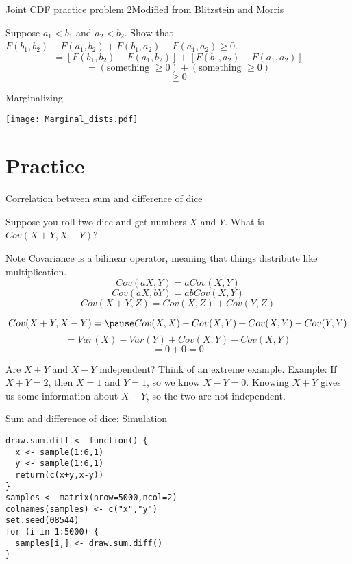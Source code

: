\documentclass{beamer}
\begin{document}
\begin{frame}{Joint CDF practice problem 2}{Modified from Blitzstein and Morris}

Suppose $a_1<b_1$ and $a_2<b_2$. Show that $F(b_1,b_2)-F(a_1,b_2)+F(b_1,a_2)-F(a_1,a_2)\geq 0$. \\
\pause
$$=\left[F(b_1,b_2)-F(a_1,b_2)\right]+\left[F(b_1,a_2)-F(a_1,a_2)\right]$$
\pause
$$=(\text{something }\geq 0) + (\text{something }\geq 0)$$
\pause
$$\geq 0$$
\end{frame}

\begin{frame}{Marginalizing}
\begin{center}\texttt{[image: Marginal\_dists.pdf]}\end{center}
\end{frame}

\section{Practice}

\begin{frame}{Correlation between sum and difference of dice}
\begin{small}
Suppose you roll two dice and get numbers $X$ and $Y$. What is $Cov(X+Y,X-Y)$?
\pause
\begin{block}{Note}
Covariance is a \alert{bilinear} operator, meaning that things distribute like multiplication.
$$Cov(aX,Y)=aCov(X,Y)$$
$$Cov(aX,bY)=abCov(X,Y)$$
$$Cov(X+Y,Z)=Cov(X,Z)+Cov(Y,Z)$$
\end{block}
\pause
$$Cov(X+Y,X-Y)=\pause Cov(X,X)-Cov(X,Y)+Cov(X,Y)-Cov(Y,Y)$$
\pause
$$=Var(X)-Var(Y)+Cov(X,Y)-Cov(X,Y)$$
\pause
$$=0 + 0 = 0$$
\end{small}
\end{frame}

\begin{frame}
Are $X+Y$ and $X-Y$ independent? Think of an extreme example.
\pause
\newline
\newline
Example: If $X+Y=2$, then $X=1$ and $Y=1$, so we know $X-Y=0$. Knowing $X+Y$ gives us some information about $X-Y$, so the two are not independent.
\end{frame}

\begin{frame}[fragile]{Sum and difference of dice: Simulation}
\pause
\begin{verbatim}
draw.sum.diff <- function() {
  x <- sample(1:6,1)
  y <- sample(1:6,1)
  return(c(x+y,x-y))
}
samples <- matrix(nrow=5000,ncol=2)
colnames(samples) <- c("x","y")
set.seed(08544)
for (i in 1:5000) {
  samples[i,] <- draw.sum.diff()
}
\end{verbatim}
\end{frame}
\end{document}
